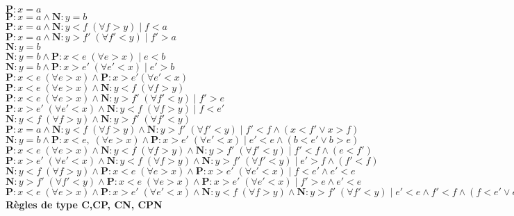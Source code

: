 \documentclass[a4paper]{article}
\begin{document}
\begin{landscape}
\noindent$\mathbf{P}:x=a$\\
$\mathbf{P}:x=a\wedge \mathbf{N}:y=b$\\
$\mathbf{P}:x=a\wedge \mathbf{N}:y<f\;(\forall f>y)\;|\; f<a$\\
$\mathbf{P}:x=a\wedge \mathbf{N}:y>f'\;(\forall f'<y)\;|\; f'>a$\\
$\mathbf{N}:y=b$\\
$\mathbf{N}:y=b \wedge \mathbf{P}:x<e\;(\forall e>x)\;| \; e<b$\\
$\mathbf{N}:y=b \wedge \mathbf{P}:x>e'\;(\forall e'<x)\;| \; e'>b$\\
$\mathbf{P}:x<e\;(\forall e>x)\wedge \mathbf{P}:x>e'(\forall e'<x)$\\
$\mathbf{P}:x<e\;(\forall e>x)\wedge \mathbf{N}:y<f\; (\forall f>y)$\\
$\mathbf{P}:x<e\;(\forall e>x)\wedge \mathbf{N}:y>f'\; (\forall f'<y)\;|\; f'>e$\\
$\mathbf{P}:x>e'\; (\forall e'<x)\wedge \mathbf{N}:y<f\; (\forall f>y)\;|\; f<e'$\\
$\mathbf{N}:y<f\; (\forall f>y)\wedge \mathbf{N}:y>f'\; (\forall f'<y)$\\
$\mathbf{P}:x=a\wedge \mathbf{N}:y<f\;(\forall f>y)\wedge \mathbf{N}:y>f'\;(\forall f'<y)\;|\; f'<f\wedge (x<f'\vee x>f)$\\
$\mathbf{N}:y=b\wedge \mathbf{P}:x<e,\; (\forall e>x)\wedge \mathbf{P}:x>e'\; (\forall e'<x)\;|\; e'<e\wedge (b<e'\vee b>e)$\\
$\mathbf{P}:x<e\; (\forall e>x)\wedge \mathbf{N}:y<f\; (\forall f>y)\wedge \mathbf{N}:y>f'\; (\forall f'<y)\;|\; f'<f\wedge (e<f')$\\
$\mathbf{P}:x>e'\; (\forall e'<x)\wedge \mathbf{N}:y<f\; (\forall f>y) \wedge \mathbf{N}:y>f'\; (\forall f'<y)\;|\; e'>f\wedge (f'<f)$\\
$\mathbf{N}:y<f\; (\forall f>y)\wedge \mathbf{P}:x<e\; (\forall e>x) \wedge \mathbf{P}:x>e'\; (\forall e'<x)\;|\; f<e'\wedge e'<e$\\
$\mathbf{N}:y>f'\; (\forall f'<y)\wedge \mathbf{P}:x<e\; (\forall e>x) \wedge \mathbf{P}:x>e'\; (\forall e'<x)\;|\; f'>e\wedge e'<e$\\
$\mathbf{P}:x<e\; (\forall e>x)\wedge \mathbf{P}:x>e'\; (\forall e'<x)\wedge \mathbf{N}:y<f\; (\forall f>y) \wedge \mathbf{N}:y>f'\; (\forall f'<y)\;|\; e'<e\wedge f'<f\wedge (f<e'\vee e<f')$\\

\noindent \textbf{Règles de type C,CP, CN, CPN}\\


\end{landscape}
\end{document}
